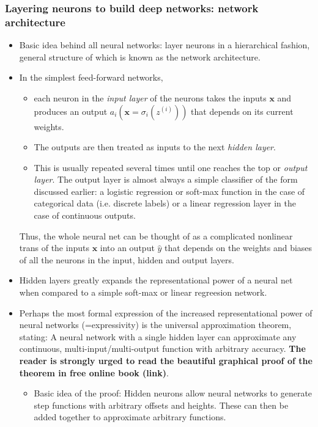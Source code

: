 \documentclass[norsk,a4paper,11pt]{article}
\begin{document}
\subsubsection{Layering neurons to build deep networks: network architecture}
\begin{itemize}
	\item Basic idea behind all neural networks: layer neurons in a hierarchical fashion, general structure of which is known as the network architecture.
	\item In the simplest feed-forward networks, 
	\begin{itemize}
		\item each neuron in the \textit{input layer} of the neurons takes the inputs $\bm{x}$ and produces an output $a_i(\bm{x}= \sigma_i(z^{(i)}))$ that depends on its current weights. 
		\item The outputs are then treated as inputs to the next \textit{hidden layer}. 
		\item This is usually repeated several times until one reaches the top or \textit{output layer}. The output layer is almost always a simple classifier of the form discussed earlier: a logistic regression or soft-max function in the case of categorical data (i.e. discrete labels) or a linear regression layer in the case of continuous outputs. 
	\end{itemize}
	Thus, the whole neural net can be thought of as a complicated nonlinear trans of the inputs $\bm{x}$ into an output $\hat{y}$ that depends on the weights and biases of all the neurons in the input, hidden and output layers.
	\item Hidden layers greatly expands the representational power of a neural net when compared to a simple soft-max or linear regreesion network.
	\item Perhaps the most formal expression of the increased representational power of neural networks (=expressivity) is the universal approximation theorem, stating: A neural network with a single hidden layer can approximate any continuous, multi-input/multi-output function with arbitrary accuracy. \textbf{The reader is strongly urged to read the beautiful graphical proof of the theorem in free online book (link)}. 
	\begin{itemize}
		\item Basic idea of the proof: Hidden neurons allow neural networks to generate step functions with arbitrary offsets and heights. These can then be added together to approximate arbitrary functions. 
	\end{itemize}

\end{itemize}
\end{document}

